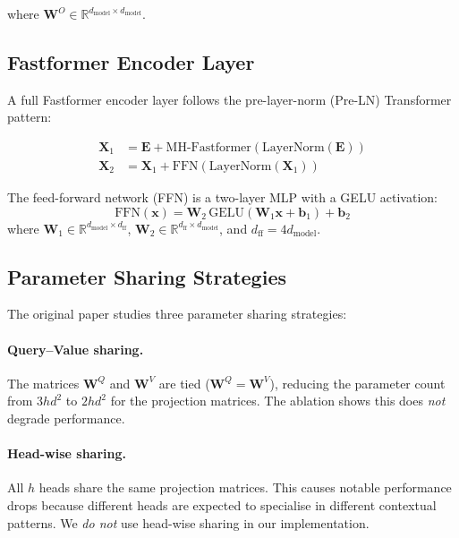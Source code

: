 \documentclass[11pt,a4paper]{article}
\newcommand{\mat}[1]{\mathbf{#1}}
\newcommand{\vect}[1]{\mathbf{#1}}
\newcommand{\R}{\mathbb{R}}
\theoremstyle{definition}
\begin{document}
where $\mat{W}^{O}\in\R^{d_{\text{model}}\times d_{\text{model}}}$.

\subsection{Fastformer Encoder Layer}

A full Fastformer encoder layer follows the pre-layer-norm (Pre-LN) Transformer pattern:

\begin{align*}
  \mat{X}_{1} &= \mat{E} + \text{MH-Fastformer}(\text{LayerNorm}(\mat{E})) \\
  \mat{X}_{2} &= \mat{X}_{1} + \text{FFN}(\text{LayerNorm}(\mat{X}_{1}))
\end{align*}

The feed-forward network (FFN) is a two-layer MLP with a GELU activation:
\begin{equation*}
  \text{FFN}(\vect{x}) = \mat{W}_{2}\,\text{GELU}(\mat{W}_{1}\vect{x}+\vect{b}_{1})+\vect{b}_{2}
\end{equation*}
where $\mat{W}_{1}\in\R^{d_{\text{model}}\times d_{\text{ff}}}$,
$\mat{W}_{2}\in\R^{d_{\text{ff}}\times d_{\text{model}}}$, and $d_{\text{ff}}=4d_{\text{model}}$.

\subsection{Parameter Sharing Strategies}
\label{sec:param_sharing}

The original paper studies three parameter sharing strategies:

\paragraph{Query--Value sharing.}
The matrices $\mat{W}^{Q}$ and $\mat{W}^{V}$ are tied ($\mat{W}^{Q}=\mat{W}^{V}$),
reducing the parameter count from $3hd^{2}$ to $2hd^{2}$ for the projection matrices.
The ablation shows this does \emph{not} degrade performance.

\paragraph{Head-wise sharing.}
All $h$ heads share the same projection matrices.
This causes notable performance drops because different heads are expected to specialise in
different contextual patterns.
We \emph{do not} use head-wise sharing in our implementation.
\end{document}

